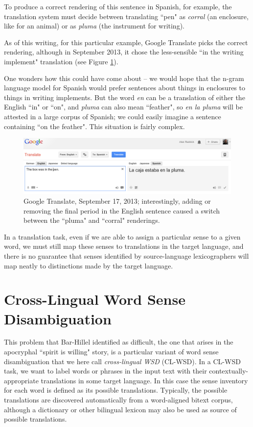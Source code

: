 To produce a correct rendering of this sentence in Spanish, for example, the
translation system must decide between translating ``pen" as \emph{corral} (an
enclosure, like for an animal) or as \emph{pluma} (the instrument for writing).

As of this writing, for this particular example, Google Translate picks the
correct rendering, although in September 2013, it chose the less-sensible 
``in the writing implement" translation (see Figure \ref{fig:box-in-pen}).

One wonders how this could have come about -- we would hope that the n-gram
language model for Spanish would prefer sentences about things in enclosures to
things in writing implements.
But the word \emph{en} can be a translation of either the English ``in" or
``on", and \emph{pluma} can also mean ``feather", so \emph{en la pluma} will be
attested in a large corpus of Spanish; we could easily imagine a sentence
containing ``on the feather". This situation is fairly complex.

\begin{figure}
  \includegraphics[width=12cm]{box-in-pen.png}
  \caption{Google Translate, September 17, 2013; interestingly, adding or
  removing the final period in the English sentence caused a switch between the
  ``pluma" and ``corral" renderings.}
  \label{fig:box-in-pen}
\end{figure}

In a translation task, even if we are able to assign a particular sense to a
given word, we must still map these senses to translations in the target
language, and there is no guarantee that senses identified by source-language
lexicographers will map neatly to distinctions made by the target language.

\section{Cross-Lingual Word Sense Disambiguation}
\label{sec:clwsd}

This problem that Bar-Hillel identified as difficult, the one that arises
in the apocryphal ``spirit is willing" story, is a particular variant of word
sense disambiguation that we here call \emph{cross-lingual WSD} (CL-WSD).
In a CL-WSD task, we  want to label words or phrases in the input text with
their contextually-appropriate translations in some target language. In this
case the
sense inventory for each word is defined as its possible translations.
Typically, the possible translations are discovered automatically from a
word-aligned bitext corpus, although a dictionary or other bilingual lexicon
may also be used as source of possible translations.

